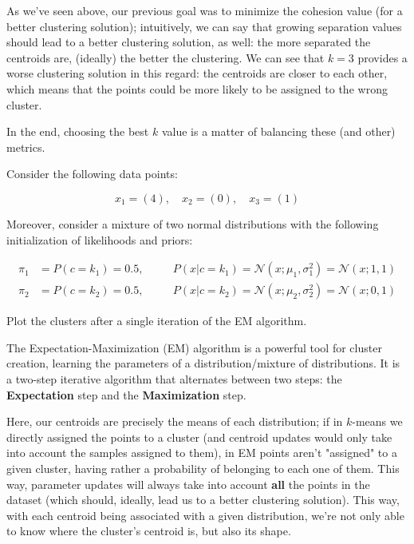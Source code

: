 \documentclass[12pt]{article}
\begin{document}
\begin{enumerate}[leftmargin=\labelsep]
  As we've seen above, our previous goal was to minimize the cohesion value (for a
  better clustering solution); intuitively, we can say that growing separation values
  should lead to a better clustering solution, as well: the more separated the
  centroids are, (ideally) the better the clustering. We can see that $k = 3$ provides
  a worse clustering solution in this regard: the centroids are closer to each other,
  which means that the points could be more likely to be assigned to the wrong cluster.

  In the end, choosing the best $k$ value is a matter of balancing these (and other)
  metrics.

  \begin{tcolorbox}[enhanced jigsaw,halign=center,colback=bg,boxrule=0pt,arc=1pt]
    \item Consider the following data points:

    \begin{equation*}
      x_1 = (4), \quad x_2 = (0), \quad x_3 = (1)
    \end{equation*}

    Moreover, consider a mixture of two normal distributions with the following
    initialization of likelihoods and priors:

    \begin{equation*}
      \begin{aligned}
        \pi_1 & = P(c = k_1) = 0.5, \quad
              &                           & P(x | c = k_1) = \mathcal{N}(x; \mu_1, \sigma_1^2) = \mathcal{N}(x; 1, 1) \\
        \pi_2 & = P(c = k_2) = 0.5, \quad
              &                           & P(x | c = k_2) = \mathcal{N}(x; \mu_2, \sigma_2^2) = \mathcal{N}(x; 0, 1)
      \end{aligned}
    \end{equation*}

    Plot the clusters after a single iteration of the EM algorithm.

  \end{tcolorbox}

  The Expectation-Maximization (EM) algorithm is a powerful tool for cluster creation,
  learning the parameters of a distribution/mixture of distributions. It is a two-step iterative algorithm that
  alternates between two steps: the \textbf{Expectation} step and the
  \textbf{Maximization} step.

  Here, our centroids are precisely the means of each distribution; if in
  $k$-means we directly assigned the points to a cluster (and centroid updates
  would only take into account the samples assigned to them), in EM points aren't
  "assigned" to a given cluster, having rather a probability of belonging to each
  one of them. This way, parameter updates will always take into account
  \textbf{all} the points in the dataset (which should, ideally, lead us to a
  better clustering solution). This way, with each centroid being associated with
  a given distribution, we're not only able to know where the cluster's centroid
  is, but also its shape.


\end{enumerate}
\end{document}
